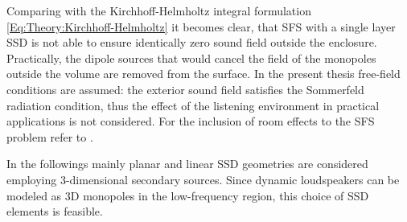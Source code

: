 Comparing with the Kirchhoff-Helmholtz integral formulation \eqref{Eq:Theory:Kirchhoff-Helmholtz} it becomes clear, that SFS with a single layer SSD is not able to ensure identically zero sound field outside the enclosure. Practically, the dipole sources that would cancel the field of the monopoles outside the volume are removed from the surface.
In the present thesis free-field conditions are assumed: the exterior sound field satisfies the Sommerfeld radiation condition, thus the effect of the listening environment in practical applications is not considered. For the inclusion of room effects to the SFS problem refer to \cite{Spors2005}.

In the followings mainly planar and linear SSD geometries are considered employing 3-dimensional secondary sources.
Since dynamic loudspeakers can be modeled as 3D monopoles in the low-frequency region, this choice of SSD elements is feasible. %


